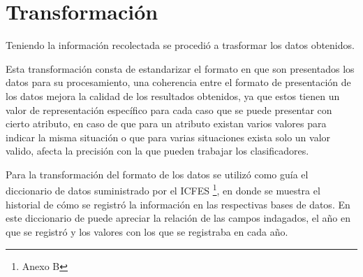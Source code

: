 \section{Transformación}
Teniendo la información recolectada se procedió a trasformar los datos obtenidos.

Esta transformación consta de estandarizar el formato en que son presentados los datos para su procesamiento, una coherencia entre el formato de presentación de los datos mejora la calidad de los resultados obtenidos, ya que estos tienen un valor de representación específico para cada caso que se puede presentar con cierto atributo, en caso de que para un atributo existan varios valores para indicar la misma situación o que para varias situaciones exista solo un valor valido, afecta la precisión con la que pueden trabajar los clasificadores.

Para la transformación del formato de los datos se utilizó como guía el diccionario de datos suministrado por el ICFES \footnote{Anexo B}, en donde se muestra el historial de cómo se registró la información en las respectivas bases de datos. En este diccionario de puede apreciar la relación de las campos indagados, el año en que se registró y los valores con los que se registraba en cada año.

